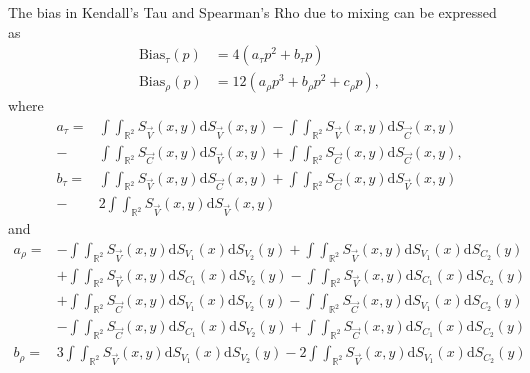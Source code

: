 \begin{theorem}\label{theorem:main}
    The bias in Kendall's Tau and Spearman's Rho due to mixing can be expressed as
    \begin{align*}
        \text{Bias}_{\tau}(p)&= 4\left(a_{\tau}p^2+b_{\tau}p\right)\\
        \text{Bias}_{\rho}(p)&= 12\left(a_{\rho}p^3+b_{\rho}p^2+c_{\rho}p\right),
    \end{align*}
    where
    \begin{align*}
        a_\tau=&\int\int_{\mathbb{R}^2}S_{\vec{V}}(x,y)\mathrm{d}S_{\vec{V}}(x,y)-\int\int_{\mathbb{R}^2}S_{\vec{V}}(x,y)\mathrm{d}S_{\vec{C}}(x,y)\\
        -&\int\int_{\mathbb{R}^2}S_{\vec{C}}(x,y)\mathrm{d}S_{\vec{V}}(x,y)+\int\int_{\mathbb{R}^2}S_{\vec{C}}(x,y)\mathrm{d}S_{\vec{C}}(x,y),\\
        b_\tau=&\int\int_{\mathbb{R}^2}S_{\vec{V}}(x,y)\mathrm{d}S_{\vec{C}}(x,y)+\int\int_{\mathbb{R}^2}S_{\vec{C}}(x,y)\mathrm{d}S_{\vec{V}}(x,y)\\
        -&2\int\int_{\mathbb{R}^2}S_{\vec{V}}(x,y)\mathrm{d}S_{\vec{V}}(x,y)
    \end{align*}
    and
    \begin{align*}
        a_\rho=&-\int\int_{\mathbb{R}^2}S_{\vec{V}}\left(x,y\right)\mathrm{d}S_{V_1}\left(x\right)\mathrm{d}S_{V_2}\left(y\right)+\int\int_{\mathbb{R}^2}S_{\vec{V}}\left(x,y\right)\mathrm{d}S_{V_1}\left(x\right)\mathrm{d}S_{C_2}\left(y\right)\\
        &+\int\int_{\mathbb{R}^2}S_{\vec{V}}\left(x,y\right)\mathrm{d}S_{C_1}\left(x\right)\mathrm{d}S_{V_2}\left(y\right)-\int\int_{\mathbb{R}^2}S_{\vec{V}}\left(x,y\right)\mathrm{d}S_{C_1}\left(x\right)\mathrm{d}S_{C_2}\left(y\right)\\
        &+\int\int_{\mathbb{R}^2}S_{\vec{C}}\left(x,y\right)\mathrm{d}S_{V_1}\left(x\right)\mathrm{d}S_{V_2}\left(y\right)-\int\int_{\mathbb{R}^2}S_{\vec{C}}\left(x,y\right)\mathrm{d}S_{V_1}\left(x\right)\mathrm{d}S_{C_2}\left(y\right)\\
        &-\int\int_{\mathbb{R}^2}S_{\vec{C}}\left(x,y\right)\mathrm{d}S_{C_1}\left(x\right)\mathrm{d}S_{V_2}\left(y\right)+\int\int_{\mathbb{R}^2}S_{\vec{C}}\left(x,y\right)\mathrm{d}S_{C_1}\left(x\right)\mathrm{d}S_{C_2}\left(y\right)\\
        b_\rho=&3\int\int_{\mathbb{R}^2}S_{\vec{V}}\left(x,y\right)\mathrm{d}S_{V_1}\left(x\right)\mathrm{d}S_{V_2}\left(y\right)-2\int\int_{\mathbb{R}^2}S_{\vec{V}}\left(x,y\right)\mathrm{d}S_{V_1}\left(x\right)\mathrm{d}S_{C_2}\left(y\right)\\

\end{align*}
\end{theorem}
